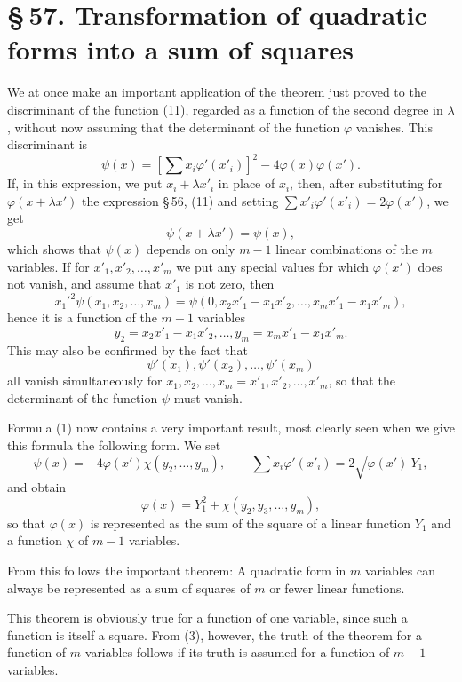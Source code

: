\documentclass[11pt]{article}
\providecommand{\sect}[2]{\section*{\S\,#1. #2}}
\begin{document}
\sect{57}{Transformation of quadratic forms into a sum of squares}

We at once make an important application of the theorem just proved to the discriminant of the function (11), regarded as a function of the second degree in $\lambda$, without now assuming that the determinant of the function $\varphi$ vanishes. This discriminant is
\begin{equation}
 \psi(x)=\left[\sum x_i\varphi'(x'_i)\right]^2-4\varphi(x)\varphi(x').
\tag{1}
\end{equation}
If, in this expression, we put $x_i+\lambda x'_i$ in place of $x_i$, then, after substituting for $\varphi(x+\lambda x')$ the expression \S\,56, (11) and setting $\sum x'_i\varphi'(x'_i)=2\varphi(x')$, we get
\[
 \psi(x+\lambda x')=\psi(x),
\]
which shows that $\psi(x)$ depends on only $m-1$ linear combinations of the $m$ variables. If for $x'_1,x'_2,\ldots,x'_m$ we put any special values for which $\varphi(x')$ does not vanish, and assume that $x'_1$ is not zero, then
\[
 x_1'^2\psi(x_1,x_2,\ldots,x_m)=
 \psi(0,x_2x'_1-x_1x'_2,\ldots,x_mx'_1-x_1x'_m),
\]
hence it is a function of the $m-1$ variables
\[
 y_2=x_2x'_1-x_1x'_2,
 \ldots,
 y_m=x_mx'_1-x_1x'_m.
\]
This may also be confirmed by the fact that
\[
 \psi'(x_1),\psi'(x_2),\ldots,\psi'(x_m)
\]
all vanish simultaneously for $x_1,x_2,\ldots,x_m=x'_1,x'_2,\ldots,x'_m$, so that the determinant of the function $\psi$ must vanish.

Formula (1) now contains a very important result, most clearly seen when we give this formula the following form. We set
\begin{equation}
 \psi(x)=-4\varphi(x')\chi(y_2,\ldots,y_m),
 \qquad
 \sum x_i\varphi'(x'_i)=2\sqrt{\varphi(x')}\,Y_1,
\tag{2}
\end{equation}
and obtain
\begin{equation}
 \varphi(x)=Y_1^2+\chi(y_2,y_3,\ldots,y_m),
\tag{3}
\end{equation}
so that $\varphi(x)$ is represented as the sum of the square of a linear function $Y_1$ and a function $\chi$ of $m-1$ variables.

From this follows the important theorem: A quadratic form in $m$ variables can always be represented as a sum of squares of $m$ or fewer linear functions.

This theorem is obviously true for a function of one variable, since such a function is itself a square. From (3), however, the truth of the theorem for a function of $m$ variables follows if its truth is assumed for a function of $m-1$ variables.
\end{document}
